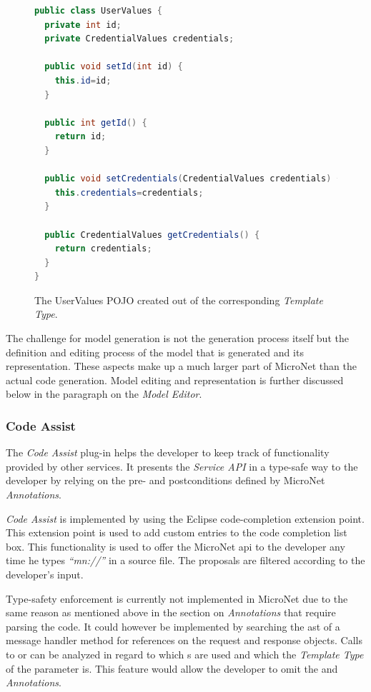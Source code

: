 \begin{figure}
\begin{lstlisting}[language=Java,firstnumber=1] 
public class UserValues {
  private int id;
  private CredentialValues credentials;

  public void setId(int id) {
    this.id=id;
  }

  public int getId() {
    return id;
  }

  public void setCredentials(CredentialValues credentials) {
    this.credentials=credentials;
  }

  public CredentialValues getCredentials() {
    return credentials;
  }
}
\end{lstlisting}
\caption{The UserValues POJO created out of the corresponding \textit{Template Type}.}
\label{lst:generated_model_class}
\end{figure}

The challenge for model generation is not the generation process itself but the
definition and editing process of the model that is generated and its
representation. These aspects make up a much larger part of MicroNet than the
actual code generation. Model editing and representation is further discussed
below in the paragraph on the \textit{Model Editor}.

\subsubsection{Code Assist}

The \textit{Code Assist} plug-in helps the developer to keep track of
functionality provided by other services. It presents the \textit{Service API}
in a type-safe way to the developer by relying on the pre- and postconditions
defined by MicroNet \textit{Annotations}.

\textit{Code Assist} is implemented by using the Eclipse code-completion
extension point. This extension point is used to add custom entries to the code
completion list box. This functionality is used to offer the MicroNet \gls{api}
to the developer any time he types \textit{``mn://''} in a source file. The
proposals are filtered according to the developer's input.

Type-safety enforcement is currently not implemented in MicroNet due to the same
reason as mentioned above in the section on \textit{Annotations} that require
parsing the \ms{} code. It could however be implemented by searching the
\gls{ast} of a message handler method for references on the request and response
objects. Calls to  or  can be
analyzed in regard to which s are used and which the
\textit{Template Type} of the parameter is. This feature would allow the
developer to omit the  and 
\textit{Annotations}.

